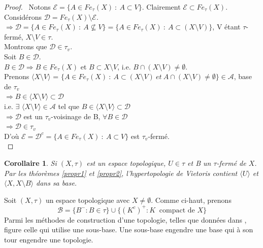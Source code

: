 \documentclass[11pt]{report}
\newenvironment{boxcorollaire}
{\begin{tcolorbox}
		[enhanced jigsaw,breakable,pad at break*=1mm,
		colback=black!5!white,boxrule=0pt,frame hidden,
		borderline east={1.5mm}{-2mm}{blue}]}
	{\end{tcolorbox}}
\theoremstyle{styletheorem}
\newtheorem{corollary}[theoreme]{Corollaire}
\theoremstyle{styledef}
\theoremstyle{remark}
\newenvironment{corollaire}{\begin{boxcorollaire}\begin{corollary}}{\end{corollary}\end{boxcorollaire}}
\begin{document}
\begin{proof}\
	Notons $\mathcal{E} = \lbrace A \in Fe_{\tau}(X) \ : \ A \subset V \rbrace$. Clairement $\mathcal{E} \subset Fe_{\tau}(X)$. \\ Considérons $\mathcal{D} = Fe_{\tau}(X) \setminus \mathcal{E} $.\\
	$\Rightarrow \mathcal{D} = \lbrace A \in Fe_{\tau}(X) \ : \ A \nsubseteq V \rbrace  = \lbrace A \in Fe_{\tau}(X) \ : \ A \subset (X \setminus V)  \rbrace$, V étant $\tau$-fermé, $X \setminus V \in \tau$.  \\
	Montrons que $\mathcal{D} \in \tau_{v}$.\\
	Soit $B \in \mathcal{D}$.\\
	$B \in \mathcal{D} \Rightarrow B \in Fe_{\tau}(X)$ et $ B \subset  X \setminus V $, i.e. $B \cap (X \setminus V) \neq \emptyset $.\\
	Prenons $ \langle X \setminus V \rangle$ = $ \lbrace A \in Fe_{\tau}(X) \ : \ A \subset (X \setminus V) \ et \ A \cap( X \setminus V) \neq \emptyset \rbrace \in \mathcal{A}$,  base de $\tau_{v}$\\
	$\Rightarrow  B \in \langle X \setminus V \rangle \subset \mathcal{D}$ \\
	i.e. $\exists$ $ \langle X \setminus V \rangle  \in \mathcal{A} $ tel que $ B \in \langle X \setminus V  \rangle  \subset \mathcal{D}$\\
	$\Rightarrow \mathcal{D}$ est un $\tau_{v}$-voisinage de B, $\forall B \in \mathcal{D}$\\
	$\Rightarrow \mathcal{D} \in \tau_{v}$\\
	D'où $\mathcal{E} = \mathcal{D}^c =  \lbrace A \in Fe_{\tau}(X) \ : \ A \subset V \rbrace$ est $\tau_{v}$-fermé. \\
\end{proof}


\begin{corollaire}
	Si $(X, \tau)$ est un espace topologique, $ U \in \tau$ et B un $\tau $-fermé de $X$. Par les théorèmes \ref{propr1} et \ref{propr2}, l'hypertopologie de Vietoris contient $\langle U \rangle$ et $\langle X, X \setminus B  \rangle$ dans sa base.
\end{corollaire}


Soit $(X,\tau)$ un espace topologique avec $X \neq \emptyset$. 
Comme ci-haut, prenons 	$$\mathcal{B} = \lbrace B^- \colon B \in \tau \rbrace \cup \lbrace (K^c)^+\colon K\ \text{ compact de } X \rbrace $$ 
Parmi les méthodes de construction d'une topologie,  telles que données dans \cite{b9}, figure celle qui utilise une sous-base. Une sous-base engendre une base qui à son tour engendre une topologie.
\end{document}
